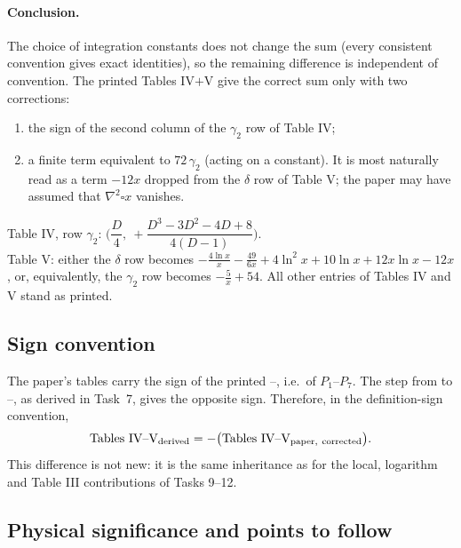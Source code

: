 \paragraph{Conclusion.} The choice of integration constants does not change the sum (every consistent convention gives exact identities), so the
remaining difference is independent of convention. The printed Tables IV$+$V give the correct sum only with two corrections:
\begin{enumerate}[leftmargin=18pt]
\item the sign of the second column of the $\gamma_2$ row of Table IV;
\item a finite term equivalent to $72\,\gamma_2$ (acting on a constant). It is most naturally read as a term $-12x$ dropped from the $\delta$ row of
Table V; the paper may have assumed that $\nabla^2\square x$ vanishes.
\end{enumerate}

\begin{resultbox}
Table IV, row $\gamma_2$: \quad $\Big(\dfrac D4,\ +\dfrac{D^3-3D^2-4D+8}{4(D-1)}\Big)$.\\[4pt]
Table V: either the $\delta$ row becomes $-\frac{4\ln x}{x}-\frac{49}{6x}+4\ln^2x+10\ln x+12x\ln x-12x$, or, equivalently,
the $\gamma_2$ row becomes $-\frac5x+54$. All other entries of Tables IV and V stand as printed.
\end{resultbox}

\subsection{Sign convention \texorpdfstring{\tD}{}}
\label{ch6:sign}

The paper's tables carry the sign of the printed --, i.e.\ of $P_1$--$P_7$. The step from  to
--, as derived in Task~7, gives the opposite sign. Therefore, in the definition-sign convention,
\begin{equation}
\text{Tables IV--V}_{\rm derived}=-\big(\text{Tables IV--V}_{\rm paper,\ corrected}\big).
\end{equation}
This difference is not new: it is the same inheritance as for the local, logarithm and Table III contributions of Tasks 9--12.

\subsection{Physical significance and points to follow \texorpdfstring{\tA}{}}
\label{ch6:physics}

